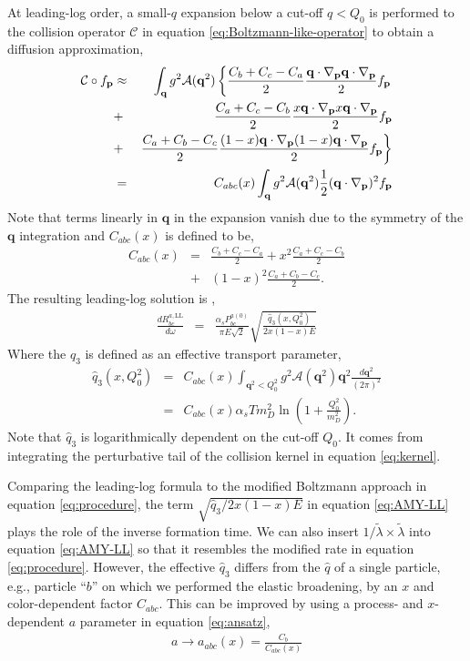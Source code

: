 \documentclass[aps, prc, reprint, amsmath, groupedaddress, nofootinbib]{revtex4-1}
\begin{document}
At leading-log order, a small-$q$ expansion below a cut-off $q<Q_0$ is performed to the collision operator $\mathcal{C}$ in equation \ref{eq:Boltzmann-like-operator} to obtain a diffusion approximation,
\begin{eqnarray}
\label{eq:Diffusion-like-operator}
\mathcal{C}\circ f_{\mathbf{p}} &\approx&  \int_{\mathbf{q}} g^2\mathcal{A}(\mathbf{q}^2)
\left\{  \frac{C_b+C_c-C_a}{2} \frac{\mathbf{q}\cdot\nabla_{\mathbf{p}} \mathbf{q}\cdot \nabla_{\mathbf{p}}}{2} f_{\bf p} \right.\\\nonumber
 &+&    \frac{C_a+C_c-C_b}{2}\frac{x\mathbf{q}\cdot \nabla_{\mathbf{p}}x\mathbf{q}\cdot \nabla_{\mathbf{p}}}{2} f_{\bf p} \\\nonumber
&+&  \left. \frac{C_a+C_b-C_c}{2}\frac{(1-x)\mathbf{q}\cdot \nabla_{\mathbf{p}}(1-x)\mathbf{q}\cdot \nabla_{\mathbf{p}}}{2}f_{\bf p}\right\}\\
&=& C_{abc}(x) \int_{\mathbf{q}} g^2\mathcal{A}(\mathbf{q}^2)\frac{1}{2}(\mathbf{q}\cdot \nabla_{\mathbf{p}})^2 f_{\mathbf{p}}
\end{eqnarray}
Note that terms linearly in $\mathbf{q}$ in the expansion vanish due to the symmetry of the $\mathbf{q}$ integration and $C_{abc}(x)$ is defined to be,
\begin{eqnarray}
C_{abc}(x) &=&  \frac{C_b+C_c-C_a}{2} + x^2 \frac{C_a+C_c-C_b}{2} \\\nonumber
&+& (1-x)^2\frac{C_a+C_b-C_c}{2}.
\end{eqnarray}
The resulting leading-log solution is \cite{Arnold:2008zu},
\begin{eqnarray}\label{eq:AMY-LL}
\frac{dR_{bc}^{a,\textrm{LL}}}{d\omega} &=& \frac{\alpha_s P_{bc}^{a(0)}}{\pi E\sqrt{2}}
\sqrt{\frac{\hat{q}_3(x, Q_0^2)}{2x(1-x)E}}
\end{eqnarray}
Where the $\hat{q}_3$ is defined as an effective transport parameter,
\begin{eqnarray}
\hat{q}_3(x, Q_0^2) &=& C_{abc}(x) \int_{\mathbf{q}^2 < Q_0^2} g^2\mathcal{A}(\mathbf{q}^2) \mathbf{q}^2 \frac{d\mathbf{q}^2}{(2\pi)^2} \\
&=& C_{abc}(x) \alpha_s T m_D^2 \ln\left(1+\frac{Q_0^2}{m_D^2}\right).\label{eq:qhat3}
\end{eqnarray}
Note that $\hat{q}_3$ is logarithmically dependent on the cut-off $Q_0$.
It comes from integrating the perturbative tail of the collision kernel in equation \ref{eq:kernel}.

Comparing the leading-log formula to the modified Boltzmann approach in equation \ref{eq:procedure}, the term $\sqrt{\hat{q}_3 / 2x(1-x)E}$ in equation \ref{eq:AMY-LL} plays the role of the inverse formation time.
We can also insert $1/\tilde{\lambda} \times \tilde{\lambda}$ into equation \ref{eq:AMY-LL} so that it resembles the modified rate in equation \ref{eq:procedure}.
However, the effective $\hat{q}_3$ differs from the $\hat{q}$ of a single particle, e.g., particle ``$b$'' on which we performed the elastic broadening, by an $x$ and color-dependent factor $C_{abc}$.
This can be improved by using a process- and $x$-dependent $a$ parameter in equation \ref{eq:ansatz},
\begin{eqnarray}
a \rightarrow a_{abc}(x) = \frac{C_b}{C_{abc}(x)}
\end{eqnarray}
\end{document}
